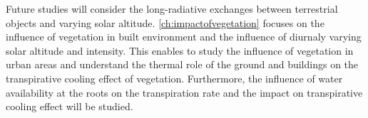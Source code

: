 Future studies will consider the long-radiative exchanges between terrestrial objects and varying solar altitude. \cref{ch:impactofvegetation} focuses on the influence of vegetation in built environment and the influence of diurnaly varying solar altitude and intensity. This enables to study the influence of vegetation in urban areas and understand the thermal role of the ground and buildings on the transpirative cooling effect of vegetation. Furthermore, the influence of water availability at the roots on the transpiration rate and the impact on transpirative cooling effect will be studied.
